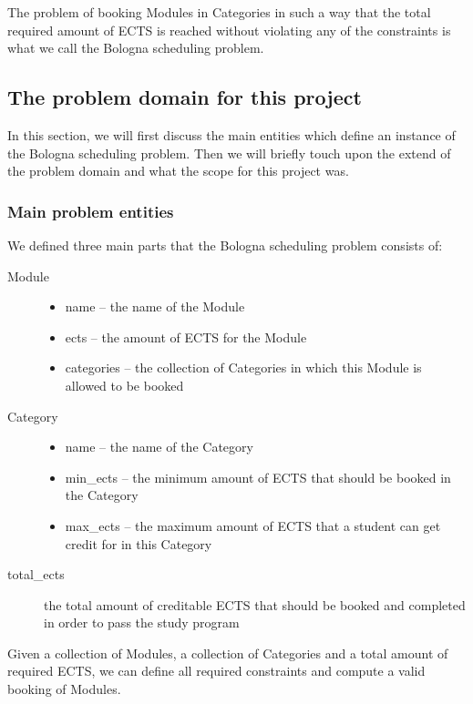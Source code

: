 \documentclass[a4paper]{article}
\begin{document}
The problem of booking Modules in Categories in such a way that the total required amount of ECTS is reached without violating any of the constraints is what we call the Bologna scheduling problem.


\subsection{The problem domain for this project}
In this section, we will first discuss the main entities which define an instance of the Bologna scheduling problem.
Then we will briefly touch upon the extend of the problem domain and what the scope for this project was.


\subsubsection{Main problem entities}
\label{sec:problem-parts}
We defined three main parts that the Bologna scheduling problem consists of:
\begin{description}
	\item[Module] \hspace*{1em}
	\begin{itemize}
		\item name -- the name of the Module
		\item ects -- the amount of ECTS for the Module
		\item categories -- the collection of Categories in which this Module is allowed to be booked
	\end{itemize}

	\item[Category] \hspace*{1em}
	\begin{itemize}
		\item name -- the name of the Category
		\item min\_ects -- the minimum amount of ECTS that should be booked in the Category
		\item max\_ects -- the maximum amount of ECTS that a student can get credit for in this Category
	\end{itemize}

	\item[total\_ects] the total amount of creditable ECTS that should be booked and completed in order to pass the study program
\end{description}
Given a collection of Modules, a collection of Categories and a total amount of required ECTS, we can define all required constraints and compute a valid booking of Modules.
\end{document}
